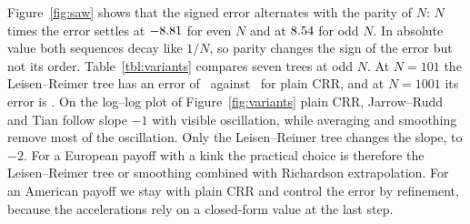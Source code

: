 Figure~\ref{fig:saw} shows that the signed error alternates with the parity of $N$: $N$ times the error settles at $-8.81$ for even $N$ and at $8.54$ for odd $N$.
In absolute value both sequences decay like $1/N$, so parity changes the sign of the error but not its order.
Table~\ref{tbl:variants} compares seven trees at odd $N$.
At $N=101$ the Leisen--Reimer tree has an error of \LRerrHundred\ against \CRRerrHundredOdd\ for plain CRR, and at $N=1001$ its error is \LRerrThousand.
On the log--log plot of Figure~\ref{fig:variants} plain CRR, Jarrow--Rudd and Tian follow slope $-1$ with visible oscillation, while averaging and smoothing remove most of the oscillation.
Only the Leisen--Reimer tree changes the slope, to $-2$.
For a European payoff with a kink the practical choice is therefore the Leisen--Reimer tree or smoothing combined with Richardson extrapolation.
For an American payoff we stay with plain CRR and control the error by refinement, because the accelerations rely on a closed-form value at the last step.
